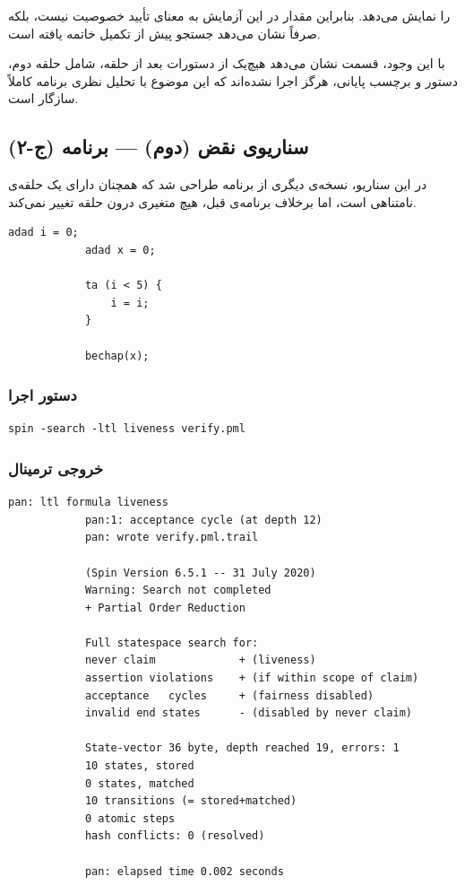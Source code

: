 \documentclass[12pt]{report}
\begin{document}
	را نمایش می‌دهد. بنابراین مقدار  در این آزمایش به معنای تأیید خصوصیت نیست، بلکه صرفاً نشان می‌دهد جستجو پیش از تکمیل خاتمه یافته است.
	
	با این وجود، قسمت  نشان می‌دهد هیچ‌یک از دستورات بعد از حلقه، شامل حلقه دوم، دستور  و برچسب پایانی، هرگز اجرا نشده‌اند که این موضوع با تحلیل نظری برنامه کاملاً سازگار است.
	
	\subsection{سناریوی نقض (دوم) --- برنامه (ج-۲)}
	
	در این سناریو، نسخه‌ی دیگری از برنامه طراحی شد که همچنان دارای یک حلقه‌ی نامتناهی است، اما برخلاف برنامه‌ی قبل، هیچ متغیری درون حلقه تغییر نمی‌کند.
	
	\begin{latin}
		\begin{lstlisting}[style=hashstyle]
			adad i = 0;
			adad x = 0;
			
			ta (i < 5) {
				i = i;
			}
			
			bechap(x);
		\end{lstlisting}
	\end{latin}
	
	\subsubsection{دستور اجرا}
	
	\begin{latin}
		\begin{lstlisting}[style=codestyle]
			spin -search -ltl liveness verify.pml
		\end{lstlisting}
	\end{latin}
	
	\subsubsection{خروجی ترمینال}
	
	\begin{latin}
		\begin{lstlisting}[style=termstyle]
			pan: ltl formula liveness
			pan:1: acceptance cycle (at depth 12)
			pan: wrote verify.pml.trail
			
			(Spin Version 6.5.1 -- 31 July 2020)
			Warning: Search not completed
			+ Partial Order Reduction
			
			Full statespace search for:
			never claim             + (liveness)
			assertion violations    + (if within scope of claim)
			acceptance   cycles     + (fairness disabled)
			invalid end states      - (disabled by never claim)
			
			State-vector 36 byte, depth reached 19, errors: 1
			10 states, stored
			0 states, matched
			10 transitions (= stored+matched)
			0 atomic steps
			hash conflicts: 0 (resolved)
			
			pan: elapsed time 0.002 seconds
		\end{lstlisting}
	\end{latin}
	
\end{document}
